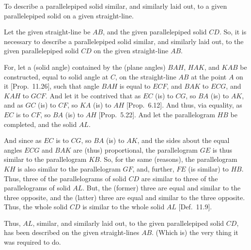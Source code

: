 \begin{Parallel}{}{}
{To describe a parallelepiped solid similar,  and
similarly laid out, to a given parallelepiped solid on a given straight-line.

Let the given straight-line be $AB$, and the given parallelepiped solid
$CD$. So, it is necessary to describe a parallelepiped solid similar, and
similarly laid out, to the given parallelepiped solid $CD$ on the given straight-line $AB$.

For, let a (solid angle) contained by the (plane angles)
$BAH$, $HAK$, and $KAB$ be constructed, equal to solid angle at
$C$, on the straight-line $AB$ at the point $A$ on it [Prop.~11.26], such that angle $BAH$ is equal to $ECF$, and $BAK$ to $ECG$,
and $KAH$ to $GCF$. And let it be contrived that as $EC$
(is) to $CG$, so $BA$ (is) to $AK$, and as $GC$ (is) to $CF$, so
$KA$ (is) to $AH$ [Prop.~6.12]. And thus, via equality, as $EC$ is to $CF$, so
$BA$ (is) to $AH$ [Prop.~5.22]. And let the parallelogram $HB$ be completed, and the solid $AL$.

\epsfysize=1.5in
\centerline{}

And since as $EC$ is to $CG$, so $BA$ (is) to $AK$, and the sides about the equal angles $ECG$ and $BAK$ are (thus) proportional, the parallelogram
$GE$ is thus similar to the parallelogram $KB$. So, for the same (reasons),
the parallelogram $KH$ is also similar to the parallelogram $GF$, and,
further, $FE$ (is similar) to $HB$. Thus, three of the parallelograms
of solid $CD$ are similar to three of the parallelograms of solid $AL$.
But, the (former) three are equal and similar to the three opposite, and
the (latter) three are equal and similar to the three opposite. Thus, the
whole solid $CD$ is similar to the whole solid $AL$ [Def.~11.9].

Thus, $AL$, similar, and similarly laid out, to the given parallelepiped solid
$CD$, has been described on the given straight-lines $AB$. (Which is) the very thing it was required to do.}
\end{Parallel}


